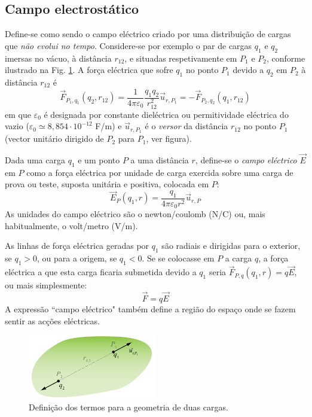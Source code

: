\documentclass[a4paper,twoside,11pt]{report}      %
\begin{document}
\subsection{\sf Campo electrostático}

Define-se como sendo o campo eléctrico criado por uma distribuição de cargas que \emph{não evolui no tempo}. Considere-se por exemplo o par de cargas $q_1$ e $q_2$ imersas no vácuo, à distância $r_{12}$, e situadas respetivamente em $P_1$ e $P_2$, conforme ilustrado na Fig. \ref{fig:fig1}. A força eléctrica que sofre $q_1$ no ponto $P_1$ devido a $q_2$ em $P_2$ à distância $r_{12}$ é
\begin{equation}
	\vec{F}_{P_1,q_1} (q_2, r_{1 2} ) =\frac{1}{4 \pi \varepsilon_0}\frac{q_1 q_2}{r_{1 2}^2} \vec{u}_{r,P_1} = 
	- \vec{F}_{P_2,q_2} (q_1, r_{1 2} )
\end{equation}
em que $\varepsilon_0$  é designada por constante dieléctrica ou permitividade eléctrica do vazio ($\varepsilon_0 \simeq 8,854 \cdot 10^{-12}$ F/m) e $\vec{u}_{r,P_1}$  é o \emph{versor} da distância $r_{1 2} $ no ponto $P_1$  (vector unitário dirigido de $P_2$ para $P_1$, ver figura).

Dada uma carga $q_1$ e um ponto $P$ a uma distância $r$, define-se o \emph{campo eléctrico} $\vec{E}$  em $P$ como a força eléctrica por unidade de carga exercida sobre uma carga de prova ou teste, suposta unitária e positiva, colocada em $P$:
\begin{equation}
	\vec{E}_P (q_1, r) = \frac{q_1}{4 \pi \varepsilon_0 r^2} \vec{u}_{r, P} 
\end{equation}
As unidades do campo eléctrico são o newton/coulomb (N/C) ou, mais habitualmente, o volt/metro (V/m).

As linhas de força eléctrica geradas por $q_1$ são radiais e dirigidas para o exterior, se $q_1>0$, ou para a origem, se $q_1<0$. Se se colocasse em $P$  a carga $q$,  a força eléctrica a que esta carga ficaria submetida devido a $q_1$  seria	
$\vec{F}_{P,q} (q_1, r ) = q \vec{E}$, 
ou mais simplesmente:
\begin{equation}
\vec{F} = q \vec{E}
\end{equation}
A expressão ``campo eléctrico" também define a região do espaço onde se fazem sentir as acções eléctricas.
\begin{figure}[t]
  \centering 
	\includegraphics[width=0.5\textwidth]{./fig1-thomson} 
	\caption{ Definição dos termos para a geometria de duas cargas. \label{fig:fig1}} 

\end{figure}
\end{document}

